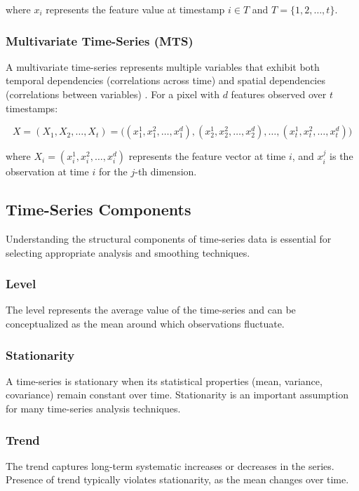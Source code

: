 \documentclass{article} %
\begin{document}
            where $x_i$ represents the feature value at timestamp $i \in T$ and $T = \{1, 2, \ldots, t\}$.

        \subsubsection{Multivariate Time-Series (MTS)}
            A multivariate time-series represents multiple variables that exhibit both temporal dependencies (correlations across time) and spatial dependencies (correlations between variables) \citep{zamanzadeh2024deep}. For a pixel with $d$ features observed over $t$ timestamps:

            \begin{equation}
            X = (X_1, X_2, \ldots, X_t)
            = \bigl(
                (x_1^1, x_1^2, \ldots, x_1^d),
                (x_2^1, x_2^2, \ldots, x_2^d),
                \ldots,
                (x_t^1, x_t^2, \ldots, x_t^d)
                \bigr)
            \end{equation}

            where $X_i = (x_i^1, x_i^2, \ldots, x_i^d)$ represents the feature vector at time $i$, and $x_i^j$ is the observation at time $i$ for the $j$-th dimension.

    \subsection{Time-Series Components}

        Understanding the structural components of time-series data is essential for selecting appropriate analysis and smoothing techniques.

        \subsubsection{Level}
            The level represents the average value of the time-series and can be conceptualized as the mean around which observations fluctuate.

        \subsubsection{Stationarity}
            A time-series is stationary when its statistical properties (mean, variance, covariance) remain constant over time. Stationarity is an important assumption for many time-series analysis techniques.

        \subsubsection{Trend}
            The trend captures long-term systematic increases or decreases in the series. Presence of trend typically violates stationarity, as the mean changes over time.
\end{document}
